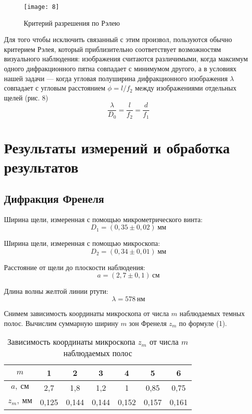 \documentclass[a4paper, 12pt]{article}
\begin{document}
\begin{wrapfigure}{4}{0.34\linewidth}
    \vspace{-10pt}
    \texttt{[image: 8]}
    \caption{Критерий разрешения по Рэлею}
\end{wrapfigure}

Для того чтобы исключить связанный с этим произвол, пользуются обычно
критерием Рэлея, который приблизительно соответствует возможностям
визуального наблюдения: изображения считаются различимыми, когда
максимум одного дифракционного пятна совпадает с минимумом другого, а
в условиях нашей задачи — когда угловая полуширина дифракционного
изображения $\lambda$ совпадает с угловым расстоянием $\phi = l/f_2$ между
изображениями отдельных щелей (рис. 8)
\begin{equation}
    \frac{\lambda}{D_0} = \frac{l}{f_2} = \frac{d}{f_1}
\end{equation}



\section{Результаты измерений и обработка результатов}
\subsection*{Дифракция Френеля}
Ширина щели, измеренная с помощью микрометрического винта:
\[
    D_1 = (0,35 \pm 0,02)\ \text{мм}
\]

Ширина щели, измеренная с помощью микроскопа:
\[
    D_2 = (0,34 \pm 0,01)\ \text{мм}
\]


Расстояние от щели до плоскости наблюдения:
\[
    a = (2,7 \pm 0,1)\ \text{см}
\]

Длина волны желтой линии ртути:
\[
    \lambda = 578\ \text{нм}
\]


Снимем зависимость координаты микроскопа от числа $m$ наблюдаемых
темных полос. Вычислим суммарную ширину $m$ зон Френеля $z_m$ по
формуле (1).


\begin{table}[H]
\centering
\begin{tabular}{|c|c|c|c|c|c|c|}
   \hline  
$m$  & 1     & 2     & 3     & 4     & 5     & 6     \\ \hline
$a,\ \text{см}$  & 2,7   & 1,8   & 1,2   & 1     & 0,85  & 0,75  \\ \hline
$z_m,\ \text{мм}$ & 0,125 & 0,144 & 0,144 & 0,152 & 0,157 & 0,161 \\ \hline
\end{tabular}
\caption{Зависимость координаты микроскопа $z_m$ от числа $m$
наблюдаемых полос}
\end{table}
\end{document}
